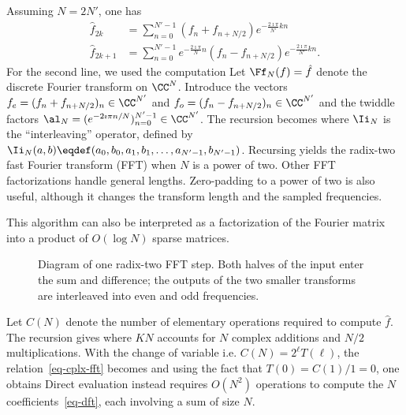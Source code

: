 Assuming $N=2N'$, one has 
\begin{align*}
	\hat f_{2k} &= \sum_{n=0}^{N'-1} (f_n + f_{n+N/2}) e^{ -\frac{2\imath\pi}{N'} k n } \\
	\hat f_{2k+1} &= \sum_{n=0}^{N'-1} e^{ -\frac{2\imath\pi}{N} n } (f_n - f_{n+N/2}) e^{ -\frac{2\imath\pi}{N'} k n }.
\end{align*}
For the second line, we used the computation
Let $\Ff_N(f)=\hat f$ denote the discrete Fourier transform on $\CC^N$. Introduce
the vectors $f_e = (f_n + f_{n+N/2})_n \in \CC^{N'}$ and $f_o = (f_n - f_{n+N/2})_n \in \CC^{N'}$
and the twiddle factors $\al_N=(e^{-2\imath\pi n/N})_{n=0}^{N'-1}\in\CC^{N'}$. The recursion becomes
where $\Ii_N$ is the ``interleaving'' operator, defined by $\Ii_N(a,b) \eqdef (a_0,b_0,a_1,b_1,\ldots,a_{N'-1},b_{N'-1})$.
%
Recursing yields the radix-two fast Fourier transform (FFT) when $N$ is a power of two. Other FFT factorizations handle general lengths. Zero-padding to a power of two is also useful, although it changes the transform length and the sampled frequencies.

This algorithm can also be interpreted as a factorization of the Fourier matrix into a product of $O(\log N)$ sparse matrices.

\begin{figure}[tbp]
\centering
{}
\caption{Diagram of one radix-two FFT step. Both halves of the input enter the sum and difference; the outputs of the two smaller transforms are interleaved into even and odd frequencies.}
\label{fig-fft}
\end{figure}
 

Let $C(N)$ denote the number of elementary operations required to compute $\hat f$. The recursion gives
where $K N$ accounts for $N$ complex additions and $N/2$ multiplications. With the change of variable
i.e. $C(N)=2^\ell T(\ell)$, the relation~\eqref{eq-cplx-fft} becomes
and using the fact that $T(0)=C(1)/1=0$, one obtains
Direct evaluation instead requires $O(N^2)$ operations to compute the $N$ coefficients~\eqref{eq-dft}, each involving a sum of size $N$.


